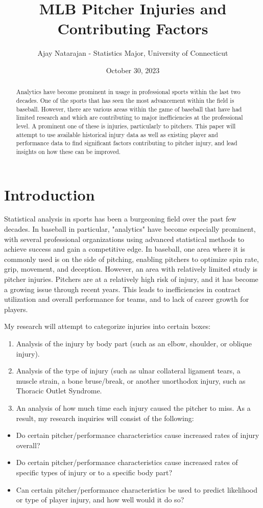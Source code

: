 \documentclass{article}
\title{MLB Pitcher Injuries and Contributing Factors}
\author{Ajay Natarajan - Statistics Major, University of Connecticut}
\date{October 30, 2023}
\begin{document}
\maketitle

\begin{abstract}
Analytics have become prominent in usage in professional sports within the last two decades. One of the sports that has seen the most advancement within the field is baseball. However, there are various areas within the game of baseball that have had limited research and which are contributing to major inefficiencies at the professional level. A prominent one of these is injuries, particularly to pitchers. This paper will attempt to use available historical injury data as well as existing player and performance data to find significant factors contributing to pitcher injury, and lead insights on how these can be improved.
\end{abstract}

\section{Introduction}
Statistical analysis in sports has been a burgeoning field over the past few decades. In baseball in particular, "analytics" have become especially prominent, with several professional organizations using advanced statistical methods to achieve success and gain a competitive edge. In baseball, one area where it is commonly used is on the side of pitching, enabling pitchers to optimize spin rate, grip, movement, and deception. However, an area with relatively limited study is pitcher injuries. Pitchers are at a relatively high risk of injury, and it has become a growing issue through recent years. This leads to inefficiencies in contract utilization and overall performance for teams, and to lack of career growth for players. 

My research will attempt to categorize injuries into certain boxes:
\begin{enumerate}
\item Analysis of the injury by body part (such as an elbow, shoulder, or oblique injury). 
\item Analysis of the type of injury (such as ulnar collateral ligament tears, a muscle strain, a bone bruse/break, or another unorthodox injury, such as Thoracic Outlet Syndrome.
\item An analysis of how much time each injury caused the pitcher to miss. As a result, my research inquiries will consist of the following:
\end{enumerate}
\begin{itemize}
  \item Do certain pitcher/performance characteristics cause increased rates of injury overall?
  \item Do certain pitcher/performance characteristics cause increased rates of specific types of injury or to a specific body part?
  \item Can certain pitcher/performance characteristics be used to predict likelihood or type of player injury, and how well would it do so?
\end{itemize}
\end{document}
